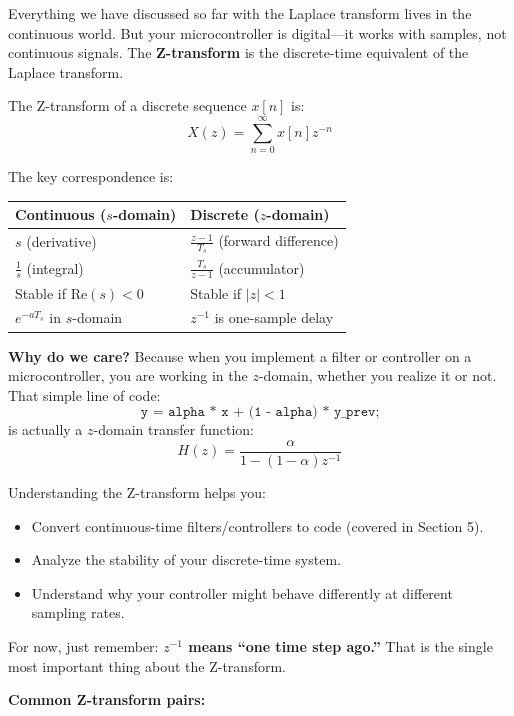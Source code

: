 Everything we have discussed so far with the Laplace transform lives in the continuous world. But your microcontroller is digital---it works with samples, not continuous signals. The \textbf{Z-transform} is the discrete-time equivalent of the Laplace transform.

The Z-transform of a discrete sequence $x[n]$ is:
\begin{equation}
X(z) = \sum_{n=0}^{\infty} x[n] z^{-n}
\end{equation}

The key correspondence is:
\begin{center}
\begin{tabular}{ll}
\toprule
\textbf{Continuous ($s$-domain)} & \textbf{Discrete ($z$-domain)} \\
\midrule
$s$ (derivative) & $\frac{z-1}{T_s}$ (forward difference) \\
$\frac{1}{s}$ (integral) & $\frac{T_s}{z-1}$ (accumulator) \\
Stable if $\text{Re}(s) < 0$ & Stable if $|z| < 1$ \\
$e^{-aT_s}$ in $s$-domain & $z^{-1}$ is one-sample delay \\
\bottomrule
\end{tabular}
\end{center}

\textbf{Why do we care?} Because when you implement a filter or controller on a microcontroller, you are working in the $z$-domain, whether you realize it or not. That simple line of code:
\[
\texttt{y = alpha * x + (1 - alpha) * y\_prev;}
\]
is actually a $z$-domain transfer function:
\[
H(z) = \frac{\alpha}{1 - (1-\alpha)z^{-1}}
\]

Understanding the Z-transform helps you:
\begin{itemize}
    \item Convert continuous-time filters/controllers to code (covered in Section 5).
    \item Analyze the stability of your discrete-time system.
    \item Understand why your controller might behave differently at different sampling rates.
\end{itemize}

For now, just remember: \textbf{$z^{-1}$ means ``one time step ago.''} That is the single most important thing about the Z-transform.

\textbf{Common Z-transform pairs:}

